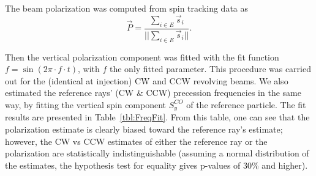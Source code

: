 \documentclass{article}
\begin{document}
The beam polarization was computed from spin tracking data as
\[
\vec P = \frac{\sum_{i\in E} \vec s_i}{||\sum_{i\in E} \vec s_i||}.
\]

Then the vertical polarization component was fitted with the fit function $f = \sin(2\pi\cdot f \cdot t)$, with $f$ the only fitted parameter. This procedure was carried out for the (identical at injection) CW and CCW revolving beams. We also estimated the reference rays' (CW \& CCW) precession frequencies in the same way, by fitting the vertical spin component $S_y^{CO}$ of the reference particle. The fit results are presented in Table~\ref{tbl:FreqFit}. From this table, one can see that the polarization estimate is clearly biased toward the reference ray's estimate; however, the CW vs CCW estimates of either the reference ray or the polarization are statistically indistinguishable (assuming a normal distribution of the estimates, the hypothesis test for equality gives p-values of 30\% and higher). 
\end{document}
